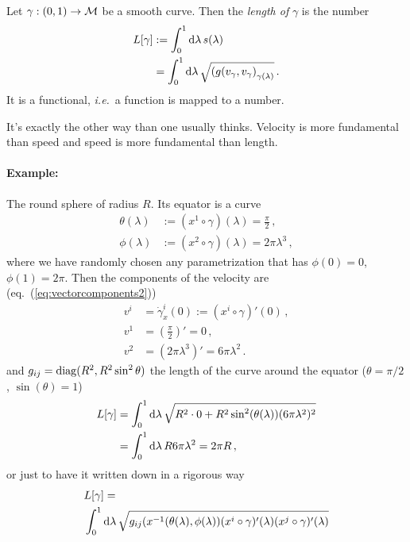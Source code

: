 \documentclass[11pt, a4paper, twocolumn]{article} %
\begin{document}
\begin{defn}
    Let $\gamma: (0,1)\to \mathcal{M}$ be a smooth curve.
    Then the \textit{length of} $\gamma$ is the number
    \begin{align}
        L[\gamma] &:= \int_0^1 \operatorname{d\!} \lambda\, s(\lambda) \\
        &= \int_0^1\operatorname{d\!} \lambda\, \sqrt{\left( g(v_\gamma,v_\gamma \right)_{\gamma(\lambda)}}\,.\nonumber
            \label{eq:lengthCurve}
    \end{align}
    It is a functional, \textit{i.e.}\ a function is mapped to a number.
\end{defn}
\begin{note}
    It's exactly the other way than one usually thinks.
    Velocity is more fundamental than speed and speed is more fundamental than
    length.
\end{note}

\paragraph{Example:} The round sphere of radius $R$.
Its equator is a curve
\begin{align}
    \theta(\lambda) &:= (x^1\circ \gamma)(\lambda) = \frac{\pi}{2}\,,\\
    \phi(\lambda) &:= (x^2\circ\gamma)(\lambda) = 2\pi \lambda^3\,,
\end{align}
where we have randomly chosen any parametrization that has
$\phi(0) = 0$, $\phi(1) = 2\pi$.
Then the components of the velocity are (eq.~(\ref{eq:vectorcomponents2}))
\begin{align*}
    v^i &= \dot{\gamma}_x^i (0) := (x^i\circ\gamma)'(0)\,,\\
    v^1 &= \left( \frac{\pi}{2} \right)' = 0\,,\\
    v^2 &= \left( 2\pi \lambda^3 \right)' = 6\pi \lambda^2\,.
\end{align*}
and $g_{ij} = \operatorname{diag}(R^2, R^2 \sin^2\theta)$ the length of the curve around the equator
($\theta = \pi/2$, $\sin(\theta) = 1$)
\begin{align*}
    L[\gamma] &= \int_0^1\operatorname{d\!}\lambda\,\sqrt{R^2\cdot 0 + R^2 \sin^2(\theta(\lambda))(6\pi\lambda^2)^2}\\
    &= \int_0^1\operatorname{d\!}\lambda\, R 6 \pi \lambda^2 = 2\pi R\,,
\end{align*}
or just to have it written down in a rigorous way
\begin{align*}
    &L[\gamma] =\\
    &\int_0^1\operatorname{d\!}\lambda\,\sqrt{g_{ij}(x^{-1}(\theta(\lambda),\phi(\lambda))(x^i\circ\gamma)'(\lambda)
        (x^j\circ\gamma)'(\lambda)}
\end{align*}
\end{document}
